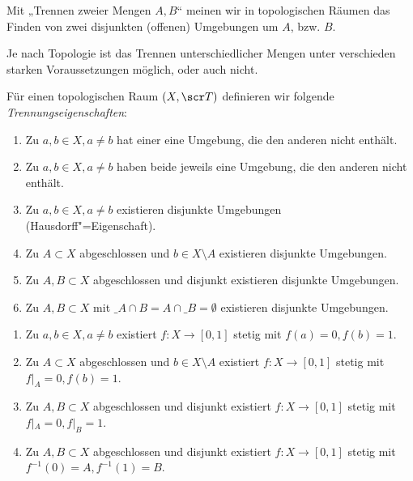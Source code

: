 Mit „Trennen zweier Mengen $A, B$“ meinen wir in topologischen Räumen das Finden von zwei disjunkten (offenen) Umgebungen um $A$, bzw. $B$.

Je nach Topologie ist das Trennen unterschiedlicher Mengen unter verschieden starken Voraussetzungen möglich, oder auch nicht.

\begin{df}[Trennungsaxiome] \label{df:separation_axioms}
	Für einen topologischen Raum $(X, \scr T)$ definieren wir folgende \emph{Trennungseigenschaften}:
	\begin{enumerate}[label=($\SepAxiom{\arabic*}$),start=0,leftmargin=3.5em,series=sepaxioms]
		\item
			Zu $a, b \in X, a \neq b$ hat einer eine Umgebung, die den anderen nicht enthält.
		\item
			Zu $a, b \in X, a \neq b$ haben beide jeweils eine Umgebung, die den anderen nicht enthält.
		\item
			Zu $a, b \in X, a \neq b$ existieren disjunkte Umgebungen (Hausdorff"=Eigenschaft).
		\item
			Zu $A \subset X$ abgeschlossen und $b \in X \setminus A$ existieren disjunkte Umgebungen.
		\item
			Zu $A, B \subset X$ abgeschlossen und disjunkt existieren disjunkte Umgebungen.
		\item
			Zu $A, B \subset X$ mit $\_A \cap B = A \cap \_B = \emptyset$ existieren disjunkte Umgebungen.
	\end{enumerate}
	\begin{enumerate}[label=($\SepAxiom{\arabic*\sfrac12}$),resume*=sepaxioms,start=2]
		\item
			Zu $a, b \in X, a \neq b$ existiert $f: X \to [0,1]$ stetig mit $f(a) = 0, f(b) = 1$.
		\item
			Zu $A \subset X$ abgeschlossen und $b \in X \setminus A$ existiert $f: X \to [0,1]$ stetig mit $f|_A = 0, f(b) = 1$.
		\item
			Zu $A, B \subset X$ abgeschlossen und disjunkt existiert $f: X \to [0,1]$ stetig mit $f|_A = 0, f|_B = 1$.
		\item
			Zu $A, B \subset X$ abgeschlossen und disjunkt existiert $f: X \to [0,1]$ stetig mit $f^{-1}(0) = A, f^{-1}(1) = B$.
	\end{enumerate}
\end{df}

